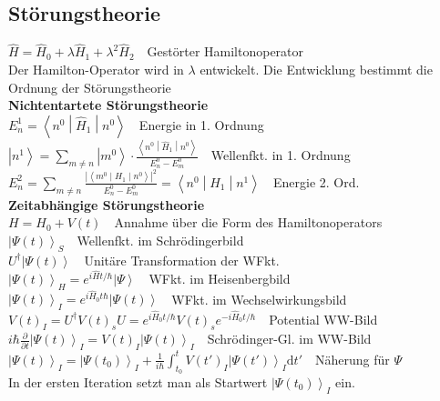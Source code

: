 \documentclass[8pt,a4paper]{extarticle}
\newcommand{\frml}[2]{$#1$~\hfill~#2\\}
\newcommand{\pder}[2]{\frac{\partial#1}{\partial#2}}
\newcommand{\ket}[1]{\left|#1\right\rangle}
\newcommand{\oper}[1]{\hat#1}
\newcommand{\bratenket}[3]                            %
{\left\langle#1 \middle| #2 \middle|  %
#3\right\rangle}
\begin{document}
\begin{multicols}{3}
\subsection{St\"orungstheorie}
\frml{\oper{H} = \oper{H}_0 + \lambda\oper{H}_1 + \lambda^2\oper{H}_2}{Gest\"orter Hamiltonoperator}
Der Hamilton-Operator wird in $\lambda$ entwickelt. Die Entwicklung bestimmt die Ordnung der St\"orungstheorie\\
\textbf{Nichtentartete St\"orungstheorie}\\
\frml{E_n^1 = \bratenket{n^0}{\oper{H}_1}{n^0}}{Energie in 1. Ordnung}
\frml{\ket{n^1} = \sum_{m\neq n} \ket{m^0}\cdot\frac{\bratenket{n^0}{\oper{H}_1}{n^0}}{E_n^0-E_m^0}}{Wellenfkt. in 1. Ordnung}
\frml{E_n^2 = \sum_{m \neq n} \frac{\left|\bratenket{m^0}{H_1}{n^0}\right|^2}{E_n^0 - E_m^0} = \bratenket{n^0}{H_1}{n^1}}{Energie 2. Ord.}
\textbf{Zeitabh\"angige St\"orungstheorie}\\
\frml{H =H_0 + V(t)}{Annahme \"uber die Form des Hamiltonoperators}
\frml{\ket{\Psi(t)}_S}{Wellenfkt. im Schr\"odingerbild}
\frml{U^\dagger\ket{\Psi(t)}}{Unit\"are Transformation der WFkt.}
\frml{\ket{\Psi(t)}_H = e^{i\oper{H}t/\hbar}\ket{\Psi}}{WFkt. im Heisenbergbild}
\frml{\ket{\Psi(t)}_I = e^{i\oper{H}_0t\hbar}\ket{\Psi(t)}}{WFkt. im Wechselwirkungsbild}
\frml{V(t)_I = U^\dagger V(t)_s U = e^{i\oper{H}_0t/\hbar}V(t)_se^{-i\oper{H}_0t/\hbar}}{Potential WW-Bild}
\frml{i\hbar\pder{}{t}\ket{\Psi(t)}_I = V(t)_I\ket{\Psi(t)}_I}{Schr\"odinger-Gl. im WW-Bild}
\frml{\ket{\Psi(t)}_I = \ket{\Psi(t_0)}_I + \frac{1}{i\hbar}\int_{t_0}^tV(t')_I\ket{\Psi(t')}_I\mathrm{d}t'}{N\"aherung f\"ur $\Psi$}
In der ersten Iteration setzt man als Startwert $\ket{\Psi(t_0)}_I$ ein.\\

\end{multicols}
\end{document}
